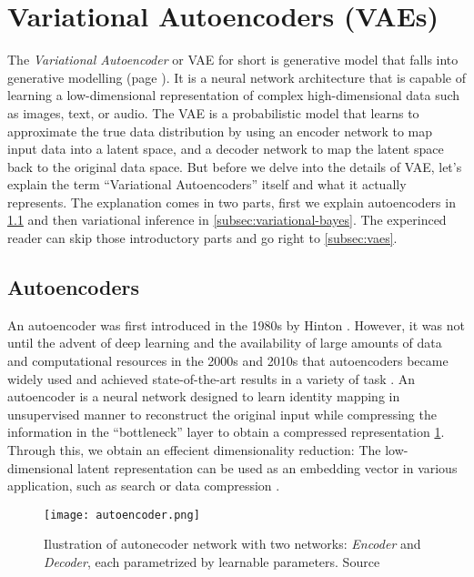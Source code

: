 \section{Variational Autoencoders (VAEs)}
\label{sec:vae}
The \textit{Variational Autoencoder} or VAE for short is generative model that falls into generative modelling (page \pageref{generative-modelling}). 
It is a neural network architecture that is capable of learning a low-dimensional representation of complex high-dimensional data such as 
images, text, or audio. The VAE is a probabilistic model that learns to approximate the true data distribution by using an encoder network to 
map input data into a latent space, and a decoder network to map the latent space back to the original data space. But before we delve into the details of VAE, 
let's explain the term ``Variational Autoencoders'' itself and what it actually represents. The explanation comes in two parts, first we explain 
autoencoders in \ref{subsec:autoencoders} and then variational inference in \ref{subsec:variational-bayes}. The experinced reader can skip those 
introductory parts and go right to \ref{subsec:vaes}.

\subsection{Autoencoders}
\label{subsec:autoencoders}
An autoencoder was first introduced in the 1980s by Hinton \cite{autoencoders-1986}. However, it was not until the advent of deep learning 
and the availability of large amounts of data and computational resources in the 2000s and 2010s that autoencoders became widely used and 
achieved state-of-the-art results in a variety of task \cite{dim-reduction-ae-2006}. An autoencoder is a neural network designed to learn 
identity mapping in unsupervised manner to reconstruct the original input while compressing the information in the ``bottleneck'' layer 
to obtain a compressed representation \ref{fig:autoencoder}. Through this, we obtain an effecient dimensionality reduction: The low-dimensional 
latent representation can be used as an embedding vector in various application, such as search or data compression \cite{ae-blog-2018}.

\begin{figure}[t]
    \centering
    \texttt{[image: autoencoder.png]}
    \caption{Ilustration of autonecoder network with two networks: \textit{Encoder} and \textit{Decoder}, each parametrized by learnable parameters.
    Source \cite{ae-blog-2018}}
    \label{fig:autoencoder}
\end{figure}


